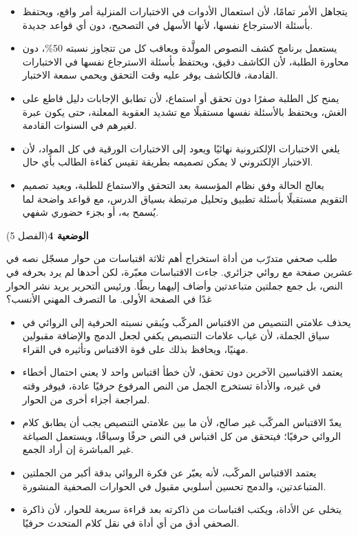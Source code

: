 \documentclass[11pt,a4paper]{article}
\begin{document}
\begin{itemize}[leftmargin=1.0cm, labelsep=6pt, itemsep=3pt, topsep=4pt, parsep=0pt]
  \item[\textbf{أ)}] يتجاهل الأمر تمامًا، لأن استعمال الأدوات في الاختبارات المنزلية أمر واقع، ويحتفظ بأسئلة الاسترجاع نفسها، لأنها الأسهل في التصحيح، دون أي قواعد جديدة.
  \item[\textbf{ب)}] يستعمل برنامج كشف النصوص المولَّدة ويعاقب كل من تتجاوز نسبته 50\%، دون محاورة الطلبة، لأن الكاشف دقيق، ويحتفظ بأسئلة الاسترجاع نفسها في الاختبارات القادمة، فالكاشف يوفر عليه وقت التحقق ويحمي سمعة الاختبار.
  \item[\textbf{ج)}] يمنح كل الطلبة صفرًا دون تحقق أو استماع، لأن تطابق الإجابات دليل قاطع على الغش، ويحتفظ بالأسئلة نفسها مستقبلًا مع تشديد العقوبة المعلنة، حتى يكون عبرة لغيرهم في السنوات القادمة.
  \item[\textbf{د)}] يلغي الاختبارات الإلكترونية نهائيًا ويعود إلى الاختبارات الورقية في كل المواد، لأن الاختبار الإلكتروني لا يمكن تصميمه بطريقة تقيس كفاءة الطالب بأي حال.
  \item[\textbf{هـ)}] يعالج الحالة وفق نظام المؤسسة بعد التحقق والاستماع للطلبة، ويعيد تصميم التقويم مستقبلًا بأسئلة تطبيق وتحليل مرتبطة بسياق الدرس، مع قواعد واضحة لما يُسمح به، أو بجزء حضوري شفهي.
\end{itemize}
\par\vspace{6pt}
\noindent
{\large\khatt\textbf{الوضعية 4}}\hfill{\small(الفصل 5)}\par\nopagebreak\vspace{3pt}
\setlength{\fboxsep}{7pt}\colorbox{gray!10}{\parbox{\dimexpr\linewidth-14pt}{طلب صحفي متدرّب من أداة استخراج أهم ثلاثة اقتباسات من حوار مسجّل نصه في عشرين صفحة مع روائي جزائري. جاءت الاقتباسات معبّرة، لكن أحدها لم يرد بحرفه في النص، بل جمع جملتين متباعدتين وأضاف إليهما ربطًا. ورئيس التحرير يريد نشر الحوار غدًا في الصفحة الأولى. ما التصرف المهني الأنسب؟}}\par\nopagebreak
\begin{itemize}[leftmargin=1.0cm, labelsep=6pt, itemsep=3pt, topsep=4pt, parsep=0pt]
  \item[\textbf{أ)}] يحذف علامتي التنصيص من الاقتباس المركّب ويُبقي نسبته الحرفية إلى الروائي في سياق الجملة، لأن غياب علامات التنصيص يكفي لجعل الدمج والإضافة مقبولين مهنيًا، ويحافظ بذلك على قوة الاقتباس وتأثيره في القراء.
  \item[\textbf{ب)}] يعتمد الاقتباسين الآخرين دون تحقق، لأن خطأ اقتباس واحد لا يعني احتمال أخطاء في غيره، والأداة تستخرج الجمل من النص المرفوع حرفيًا عادة، فيوفر وقته لمراجعة أجزاء أخرى من الحوار.
  \item[\textbf{ج)}] يعدّ الاقتباس المركّب غير صالح، لأن ما بين علامتي التنصيص يجب أن يطابق كلام الروائي حرفيًا؛ فيتحقق من كل اقتباس في النص حرفًا وسياقًا، ويستعمل الصياغة غير المباشرة إن أراد الجمع.
  \item[\textbf{د)}] يعتمد الاقتباس المركّب، لأنه يعبّر عن فكرة الروائي بدقة أكبر من الجملتين المتباعدتين، والدمج تحسين أسلوبي مقبول في الحوارات الصحفية المنشورة.
  \item[\textbf{هـ)}] يتخلى عن الأداة، ويكتب اقتباسات من ذاكرته بعد قراءة سريعة للحوار، لأن ذاكرة الصحفي أدق من أي أداة في نقل كلام المتحدث حرفيًا.
\end{itemize}
\end{document}
